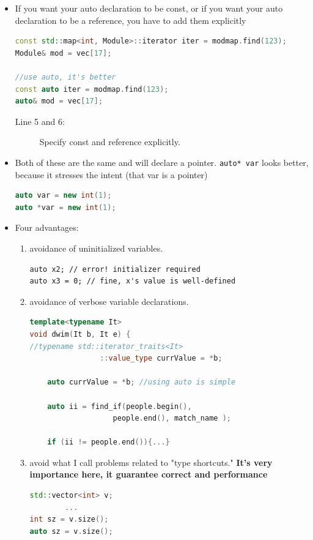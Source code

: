 \documentclass[a4paper,11pt,twoside]{book}
\begin{document}
\begin{itemize}
	\item If you want your auto declaration to be const, or if you want your auto declaration to be a reference, you have to add them explicitly
	
\begin{lstlisting}[frame=single, language=c++]
const std::map<int, Module>::iterator iter = modmap.find(123);
Module& mod = vec[17];

//use auto, it's better
const auto iter = modmap.find(123);
auto& mod = vec[17];
\end{lstlisting}
\begin{description}
	\item[Line 5 and 6:] Specify const and reference explicitly.
\end{description}
	
	\item Both of these are the same and will declare a pointer. \texttt{auto* var} looks better, because it stresses the intent (that var is a pointer) 
\begin{lstlisting}[frame=single, language=c++]
auto var = new int(1);
auto *var = new int(1);
\end{lstlisting}

	\item Four advantages:
	\begin{enumerate}
		\item avoidance of uninitialized variables.
\begin{lstlisting}[numbers=none]
auto x2; // error! initializer required
auto x3 = 0; // fine, x's value is well-defined
\end{lstlisting}

		\item avoidance of verbose variable declarations.
\begin{lstlisting}[frame=single, language=c++]
template<typename It>
void dwim(It b, It e) {
//typename std::iterator_traits<It>
                ::value_type currValue = *b;
                
	auto currValue = *b; //using auto is simple
	
	auto ii = find_if(people.begin(), 
	               people.end(), match_name );
	               
	if (ii != people.end()){...}
\end{lstlisting}

		\item avoid what I call problems related to "type shortcuts." \textbf{It's very importance here, it guarantee correct and performance}
\begin{lstlisting}[frame=single, language=c++]
std::vector<int> v;
		...
int sz = v.size();
auto sz = v.size();
		

\end{lstlisting}
\end{enumerate}
\end{itemize}
\end{document}
